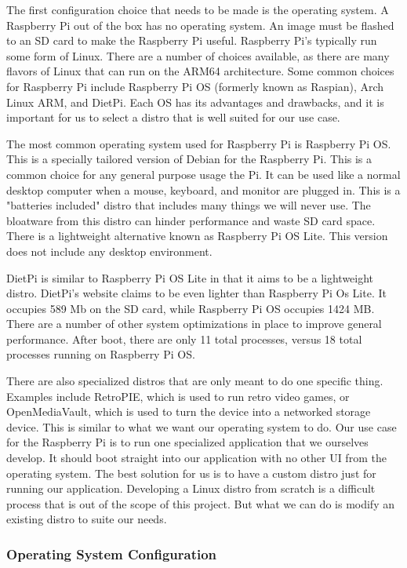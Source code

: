 The first configuration choice that needs to be made is the operating system. A Raspberry
Pi out of the box has no operating system. An image must be flashed to an SD card to make
the Raspberry Pi useful. Raspberry Pi's typically run some form of Linux. There are a
number of choices available, as there are many flavors of Linux that can run on the ARM64
architecture. Some common choices for Raspberry Pi include Raspberry Pi OS (formerly known
as Raspian), Arch Linux ARM, and DietPi. Each OS has its advantages and drawbacks, and it
is important for us to select a distro that is well suited for our use case.

The most common operating system used for Raspberry Pi is Raspberry Pi OS. This is a
specially tailored version of Debian for the Raspberry Pi. This is a common choice for any
general purpose usage the Pi. It can be used like a normal desktop computer when a mouse,
keyboard, and monitor are plugged in. This is a "batteries included" distro that includes
many things we will never use. The bloatware from this distro can hinder performance and
waste SD card space. There is a lightweight alternative known as Raspberry Pi OS Lite.
This version does not include any desktop environment.

DietPi is similar to Raspberry Pi OS Lite in that it aims to be a lightweight distro.
DietPi's website claims to be even lighter than Raspberry Pi Os Lite. It occupies 589 Mb
on the SD card, while Raspberry Pi OS occupies 1424 MB. There are a number of other system
optimizations in place to improve general performance. After boot, there are only 11 total
processes, versus 18 total processes running on Raspberry Pi OS.

There are also specialized distros that are only meant to do one specific thing. Examples
include RetroPIE, which is used to run retro video games, or OpenMediaVault, which is used
to turn the device into a networked storage device. This is similar to what we want our
operating system to do. Our use case for the Raspberry Pi is to run one specialized
application that we ourselves develop. It should boot straight into our application with
no other UI from the operating system. The best solution for us is to have a custom distro
just for running our application. Developing a Linux distro from scratch is a difficult
process that is out of the scope of this project. But what we can do is modify an existing
distro to suite our needs.

\subsubsection{Operating System Configuration}
\label{sec:research:subsec:os_config}

